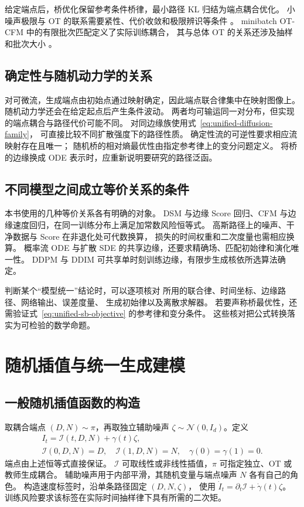 给定端点后，桥优化保留参考条件桥律，最小路径 KL 归结为端点耦合优化。
小噪声极限与 OT 的联系需要紧性、代价收敛和极限辨识等条件
\cite{leonard2014schrodinger}。
minibatch OT-CFM 中的有限批次匹配定义了实际训练耦合，
其与总体 OT 的关系还涉及抽样和批次大小 \cite{tong2024otcfm}。

\subsection{确定性与随机动力学的关系}

对可微流，生成端点由初始点通过映射确定，因此端点联合律集中在映射图像上。
随机动力学还会在给定起点后产生条件波动。
两者均可输运同一对分布，但实现的端点耦合与路径代价可能不同。
对同边缘族使用式~\eqref{eq:unified-diffusion-family}，
可直接比较不同扩散强度下的路径性质。
确定性流的可逆性要求相应流映射存在且唯一；
随机桥的相对熵最优性由指定参考律上的变分问题定义。
将桥的边缘换成 ODE 表示时，应重新说明要研究的路径泛函。

\subsection{不同模型之间成立等价关系的条件}

本书使用的几种等价关系各有明确的对象。
DSM 与边缘 Score 回归、CFM 与边缘速度回归，在同一训练分布上满足加常数风险恒等式。
高斯路径上的噪声、干净数据与 Score 在非退化处可代数换算，
损失的时间权重和二次度量也需相应换算。
概率流 ODE 与扩散 SDE 的共享边缘，还要求精确场、匹配初始律和演化唯一性。
DDPM 与 DDIM 可共享单时刻训练边缘，有限步生成核依所选算法确定。

判断某个“模型统一”结论时，可以逐项核对
所用的联合律、时间坐标、边缘路径、网络输出、误差度量、
生成初始律以及离散求解器。
若要声称桥最优性，还需验证式~\eqref{eq:unified-sb-objective} 的参考律和变分条件。
这些核对把公式转换落实为可检验的数学命题。

\section{随机插值与统一生成建模}
\label{sec:unified-interpolants}

\subsection{一般随机插值函数的构造}

取耦合端点 \((D,N)\sim\pi\)，再取独立辅助噪声
\(\zeta\sim\mathcal N(0,I_d)\)。定义
\begin{equation}
 \begin{gathered}
 I_t=\mathcal I(t,D,N)+\gamma(t)\zeta,\\
 \mathcal I(0,D,N)=D,\quad\mathcal I(1,D,N)=N,\quad
 \gamma(0)=\gamma(1)=0.
 \end{gathered}
 \label{eq:unified-interpolant}
\end{equation}
端点由上述恒等式直接保证。
\(\mathcal I\) 可取线性或非线性插值，\(\pi\) 可指定独立、OT 或教师生成耦合。
辅助噪声用于内部平滑，其随机变量与端点噪声 \(N\) 各有自己的角色。
构造速度标签时，沿单条路径固定 \((D,N,\zeta)\)，
使用 \(\dot I_t=\partial_t\mathcal I+\dot\gamma(t)\zeta\)。
训练风险要求该标签在实际时间抽样律下具有所需的二次矩。

